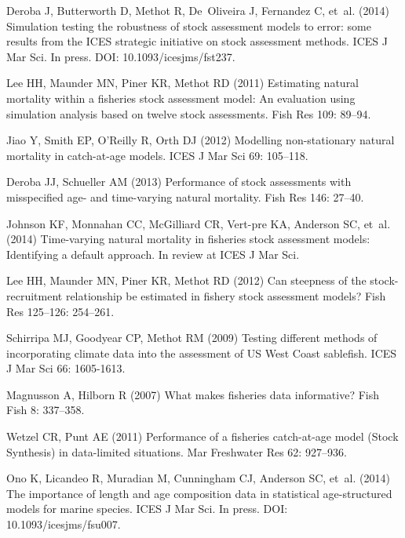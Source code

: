 \documentclass[10pt]{article}
\begin{document}
\begin{thebibliography}{10}
Deroba J, Butterworth D, Methot R, De~Oliveira J, Fernandez C, et~al. (2014)
  Simulation testing the robustness of stock assessment models to error: some
  results from the {ICES} strategic initiative on stock assessment methods.
\newblock ICES J Mar Sci. In press. DOI: 10.1093/icesjms/fst237.

Lee HH, Maunder MN, Piner KR, Methot RD (2011) Estimating natural mortality
  within a fisheries stock assessment model: An evaluation using simulation
  analysis based on twelve stock assessments.
\newblock Fish Res 109: 89--94.

Jiao Y, Smith EP, O'Reilly R, Orth DJ (2012) Modelling non-stationary natural
  mortality in catch-at-age models.
\newblock ICES J Mar Sci 69: 105--118.

Deroba JJ, Schueller AM (2013) Performance of stock assessments with
  misspecified age- and time-varying natural mortality.
\newblock Fish Res 146: 27--40.

Johnson KF, Monnahan CC, McGilliard CR, Vert-pre KA, Anderson SC, et~al. (2014)
  Time-varying natural mortality in fisheries stock assessment models:
  Identifying a default approach.
\newblock In review at ICES J Mar Sci.

Lee HH, Maunder MN, Piner KR, Methot RD (2012) Can steepness of the
  stock-recruitment relationship be estimated in fishery stock assessment
  models?
\newblock Fish Res 125--126: 254--261.

Schirripa MJ, Goodyear CP, Methot RM (2009) Testing different methods of
  incorporating climate data into the assessment of {US West Coast} sablefish.
\newblock ICES J Mar Sci 66: 1605-1613.

Magnusson A, Hilborn R (2007) What makes fisheries data informative?
\newblock Fish Fish 8: 337--358.

Wetzel CR, Punt AE (2011) Performance of a fisheries catch-at-age model ({Stock
  Synthesis}) in data-limited situations.
\newblock Mar Freshwater Res 62: 927--936.

Ono K, Licandeo R, Muradian M, Cunningham CJ, Anderson SC, et~al. (2014) The
  importance of length and age composition data in statistical age-structured
  models for marine species.
\newblock ICES J Mar Sci. In press. DOI: 10.1093/icesjms/fsu007.


\end{thebibliography}
\end{document}
